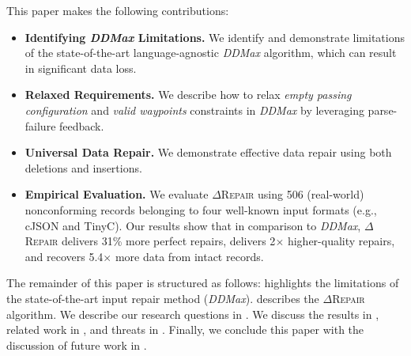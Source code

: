 \documentclass[acmsmall,screen,review,anonymous]{acmart}
\newcommand{\dtask}{data repair\xspace}
\newcommand{\approach}{\textsc{$\Delta$Repair}\xspace}
\newcommand{\ddmax}{\textit{DDMax}\xspace}
\newcommand{\drepair}{\approach}
\begin{document}
This paper makes the following
contributions:
\begin{itemize}
\item \textbf{Identifying \ddmax Limitations.}
We identify and demonstrate limitations of 
the state-of-the-art language-agnostic \ddmax algorithm, which can result in significant data loss.
\item \textbf{Relaxed Requirements.} We describe how to relax
\emph{empty passing configuration} and \emph{valid waypoints} constraints in \ddmax by leveraging parse-failure feedback.
\item \textbf{Universal Data Repair.}
We demonstrate effective \dtask using both deletions and insertions.
\item \textbf{Empirical Evaluation.} We evaluate \drepair using 506 (real-world) nonconforming
records belonging to four well-known input formats (e.g., cJSON and TinyC). 
Our results show that in comparison to \ddmax,
\drepair delivers 31\% more perfect repairs, %
delivers 2$\times$ higher-quality repairs,  %
and recovers 5.4$\times$ more data from intact records.   %

\end{itemize}

The remainder of this paper is structured as follows: 
 highlights the limitations of the 
state-of-the-art input repair method (\ddmax).
describes the \drepair algorithm. We describe our research questions in
.
We discuss the results in ,
related work in , and threats in .
Finally, we conclude this paper 
with the discussion of future work in . 
\end{document}
